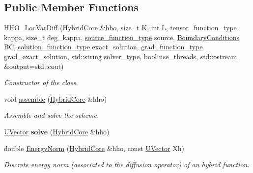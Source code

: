 \subsection*{Public Member Functions}
\begin{DoxyCompactItemize}
\item 
\hyperlink{group__HHO__LocVarDiff_ga82ef4509a6352116618e6753b5440e1d}{H\+H\+O\+\_\+\+Loc\+Var\+Diff} (\hyperlink{classHArDCore2D_1_1HybridCore}{Hybrid\+Core} \&hho, size\+\_\+t K, int L, \hyperlink{classHArDCore2D_1_1HHO__LocVarDiff_ab9add9590d4d5b4193799e917c8d746b}{tensor\+\_\+function\+\_\+type} kappa, size\+\_\+t deg\+\_\+kappa, \hyperlink{classHArDCore2D_1_1HHO__LocVarDiff_a5a85ff6ce87c2247d4a4af57b070320d}{source\+\_\+function\+\_\+type} source, \hyperlink{classBoundaryConditions}{Boundary\+Conditions} BC, \hyperlink{classHArDCore2D_1_1HHO__LocVarDiff_ae1c9d7cb11a0b31461d4c19c3b7a7aab}{solution\+\_\+function\+\_\+type} exact\+\_\+solution, \hyperlink{classHArDCore2D_1_1HHO__LocVarDiff_ae0ce0c1a88fe08ddd972cbed5a9e4837}{grad\+\_\+function\+\_\+type} grad\+\_\+exact\+\_\+solution, std\+::string solver\+\_\+type, bool use\+\_\+threads, std\+::ostream \&output=std\+::cout)
\begin{DoxyCompactList}\small\item\em Constructor of the class. \end{DoxyCompactList}\item 
void \hyperlink{group__HHO__LocVarDiff_ga5a556b259e62cf0474e2f933da569b15}{assemble} (\hyperlink{classHArDCore2D_1_1HybridCore}{Hybrid\+Core} \&hho)
\begin{DoxyCompactList}\small\item\em Assemble and solve the scheme. \end{DoxyCompactList}\item 
\hyperlink{classHArDCore2D_1_1UVector}{U\+Vector} {\bfseries solve} (\hyperlink{classHArDCore2D_1_1HybridCore}{Hybrid\+Core} \&hho)
\item 
double \hyperlink{group__HHO__LocVarDiff_ga11896824f2d3a743fd7caabeb396f158}{Energy\+Norm} (\hyperlink{classHArDCore2D_1_1HybridCore}{Hybrid\+Core} \&hho, const \hyperlink{classHArDCore2D_1_1UVector}{U\+Vector} Xh)
\begin{DoxyCompactList}\small\item\em Discrete energy norm (associated to the diffusion operator) of an hybrid function. \end{DoxyCompactList}\item 
\mbox{\label{classHArDCore2D_1_1HHO__LocVarDiff_afef8cb4110ec3b95f3c83090fe26d598}} 

\end{DoxyCompactItemize}
